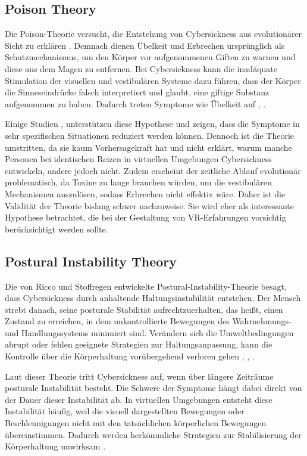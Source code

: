 \subsection{Poison Theory} \label{sec:poison_theory}
Die Poison-Theorie versucht, die Entstehung von Cybersickness aus evolutionärer Sicht zu erklären \cite{Treisman}. Demnach dienen Übelkeit und Erbrechen ursprünglich als Schutzmechanismus, um den Körper vor aufgenommenen Giften zu warnen und diese aus dem Magen zu entfernen. Bei Cybersickness kann die inadäquate Stimulation der visuellen und vestibulären Systeme dazu führen, dass der Körper die Sinneseindrücke falsch interpretiert und glaubt, eine giftige Substanz aufgenommen zu haben. Dadurch treten Symptome wie Übelkeit auf \cite{Josephj.LaViolaJr.2000}, \cite{Gavgani2018}.

Einige Studien \cite{Crampton2000}, \cite{Oman2012} unterstützen diese Hypothese und zeigen, dass die Symptome in sehr spezifischen Situationen reduziert werden können. Dennoch ist die Theorie umstritten, da sie kaum Vorhersagekraft hat und nicht erklärt, warum manche Personen bei identischen Reizen in virtuellen Umgebungen Cybersickness entwickeln, andere jedoch nicht. Zudem erscheint der zeitliche Ablauf evolutionär problematisch, da Toxine zu lange brauchen würden, um die vestibulären Mechanismen auszulösen, sodass Erbrechen nicht effektiv wäre. Daher ist die Validität der Theorie bislang schwer nachzuweise. Sie wird eher als interessante Hypothese betrachtet, die bei der Gestaltung von VR-Erfahrungen vorsichtig berücksichtigt werden sollte.

\subsection{Postural Instability Theory}
Die von Ricco und Stoffregen \cite{Riccio1991} entwickelte Postural-Instability-Theorie besagt, dass Cybersickness durch anhaltende Haltungsinstabilität entstehen. Der Mensch strebt danach, seine posturale Stabilität aufrechtzuerhalten, das heißt, einen Zustand zu erreichen, in dem unkontrollierte Bewegungen des Wahrnehmungs- und Handlungssystems minimiert sind. Verändern sich die Umweltbedingungen abrupt oder fehlen geeignete Strategien zur Haltungsanpassung, kann die Kontrolle über die Körperhaltung vorübergehend verloren gehen \cite{Josephj.LaViolaJr.2000}, \cite{Riccio1991}, \cite{Gavgani2018}.

Laut dieser Theorie tritt Cybersickness auf, wenn über längere Zeiträume posturale Instabilität besteht. Die Schwere der Symptome hängt dabei direkt von der Dauer dieser Instabilität ab. In virtuellen Umgebungen entsteht diese Instabilität häufig, weil die visuell dargestellten Bewegungen oder Beschleunigungen nicht mit den tatsächlichen körperlichen Bewegungen übereinstimmen. Dadurch werden herkömmliche Strategien zur Stabilisierung der Körperhaltung unwirksam \cite{Riccio1991}.


